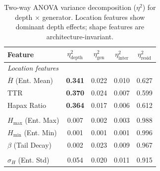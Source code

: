 \begin{table}[t]
\centering
\caption{Two-way ANOVA variance decomposition ($\eta^2$) for depth $\times$ generator. Location features show dominant depth effects; shape features are architecture-invariant.}
\label{tab:anova_decomposition}
\small
\begin{tabular}{l cccc}
\toprule
Feature & $\eta^2_{\text{depth}}$ & $\eta^2_{\text{gen}}$ & $\eta^2_{\text{inter}}$ & $\eta^2_{\text{resid}}$ \\
\midrule
\multicolumn{5}{l}{\textit{Location features}} \\
  $\bar{H}$ (Ent. Mean) & \textbf{0.341} & 0.022 & 0.010 & 0.627 \\
  TTR & \textbf{0.370} & 0.024 & 0.007 & 0.599 \\
  Hapax Ratio & \textbf{0.364} & 0.017 & 0.006 & 0.612 \\
\addlinespace
\multicolumn{5}{l}{\textit{Shape features}} \\
  $H_{\max}$ (Ent. Max) & 0.007 & 0.002 & 0.003 & 0.988 \\
  $H_{\min}$ (Ent. Min) & 0.001 & 0.001 & 0.001 & 0.996 \\
  $\beta$ (Tail Decay) & 0.002 & 0.023 & 0.009 & 0.967 \\
\addlinespace
\multicolumn{5}{l}{\textit{Intermediate features}} \\
  $\sigma_H$ (Ent. Std) & 0.054 & 0.020 & 0.011 & 0.915 \\
\bottomrule
\end{tabular}
\end{table}
